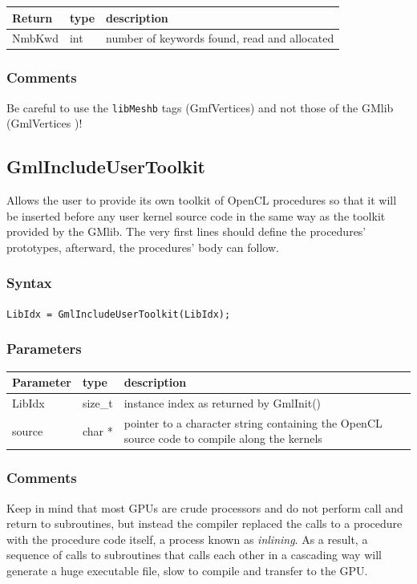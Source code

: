 \documentclass[a4paper,12pt]{article}
\begin{document}
\medskip

\begin{tabular}{|m{2cm}|m{1.5cm}|m{10.5cm}|}
\hline
Return     & type   & description \\
\hline
NmbKwd     & int    & number of keywords found, read and allocated \\
\hline
\end{tabular}

\subsubsection*{Comments}
Be careful to use the {\tt libMeshb} tags (GmfVertices) and not those of the GMlib (GmlVertices )!


\subsection{GmlIncludeUserToolkit}
Allows the user to provide its own toolkit of OpenCL procedures so that it will be inserted before any user kernel source code in the same way as the toolkit provided by the GMlib. The very first lines should define the procedures' prototypes, afterward, the procedures' body can follow.

\subsubsection*{Syntax}
{\tt LibIdx = GmlIncludeUserToolkit(LibIdx);}

\subsubsection*{Parameters}
\begin{tabular}{|m{2cm}|m{1.5cm}|m{10.5cm}|}
\hline
Parameter  & type   & description \\
\hline
LibIdx     & size\_t & instance index as returned by GmlInit() \\
\hline
source     & char *  & pointer to a character string containing the OpenCL source code to compile along the kernels \\
\hline
\end{tabular}

\subsubsection*{Comments}
Keep in mind that most GPUs are crude processors and do not perform call and return to subroutines, but instead the compiler replaced the calls to a procedure with the procedure code itself, a process known as \emph{inlining}. As a result, a sequence of calls to subroutines that calls each other in a cascading way will generate a huge executable file, slow to compile and transfer to the GPU.
\end{document}
